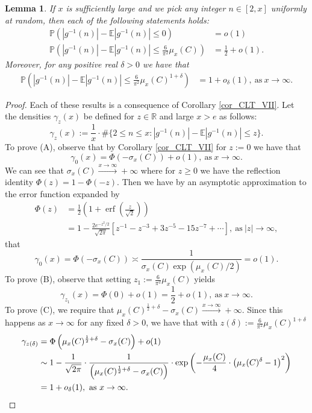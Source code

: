 \documentclass[11pt,reqno,a4letter]{article}
\numberwithin{figure}{section}
\numberwithin{table}{section}
\theoremstyle{plain}
\newtheorem{lemma}[theorem]{Lemma}
\numberwithin{theorem}{section}
\theoremstyle{definition}
\begin{document}
\begin{lemma} 
\label{lemma_ProbsOfAbsgInvnDist_v2} 
If $x$ is sufficiently large and we pick any integer $n \in [2, x]$ uniformly at random, then 
each of the following statements holds: 
\begin{align*} 
\tag{A}
\mathbb{P}\left(|g^{-1}(n)| - \mathbb{E}|g^{-1}(n)| \leq 0\right) & = o(1) \\ 
\tag{B} 
\mathbb{P}\left(|g^{-1}(n)| - \mathbb{E}|g^{-1}(n)| \leq \frac{6}{\pi^2} \mu_x(C)\right) & = 
     \frac{1}{2} + o(1). 
\end{align*} 
Moreover, for any positive real $\delta > 0$ we have that 
\begin{align*} 
\tag{C} 
\mathbb{P}\left(|g^{-1}(n)| - \mathbb{E}|g^{-1}(n)| \leq \frac{6}{\pi^2} \mu_x(C)^{1 + \delta}\right) & = 
     1 + o_{\delta}(1), 
     \mathrm{\ as\ } x \rightarrow \infty. 
\end{align*} 
\end{lemma} 
\begin{proof} 
Each of these results is a consequence of Corollary \ref{cor_CLT_VII}. 
Let the densities $\gamma_z(x)$ be defined for $z \in \mathbb{R}$ and 
large $x > e$ as follows: 
\[
\gamma_z(x) := \frac{1}{x} \cdot \#\{2 \leq n \leq x: |g^{-1}(n)| - \mathbb{E}|g^{-1}(n)| \leq z\}. 
\]
To prove (A), observe that by Corollary \ref{cor_CLT_VII} for $z := 0$ we have that 
\[
\gamma_0(x) = \Phi\left(-\sigma_x(C)\right) + o(1), \mathrm{\ as\ } x \rightarrow \infty. 
\]
We can see that $\sigma_x(C) \xrightarrow{x \rightarrow \infty} +\infty$ where for $z \geq 0$ we have the 
reflection identity $\Phi(z) = 1 - \Phi(-z)$. Then we have by an asymptotic approximation 
to the error function expanded by 
\begin{align*} 
\Phi(z) & = \frac{1}{2}\left(1 + \operatorname{erf}\left(\frac{z}{\sqrt{2}}\right)\right) \\ 
     & = 1 - \frac{2e^{-z^2/2}}{\sqrt{2\pi}}\left[ 
     z^{-1} - z^{-3} + 3z^{-5} - 15z^{-7} + \cdots 
     \right], \mathrm{\ as\ } |z| \rightarrow \infty, 
\end{align*} 
that 
\[
\gamma_0(x) = \Phi\left(-\sigma_x(C)\right) \asymp \frac{1}{\sigma_x(C) \exp(\mu_x(C)/2)} = o(1). 
\]
To prove (B), observe that setting $z_1 := \frac{6}{\pi^2} \mu_x(C)$ yields 
\[
\gamma_{z_1}(x) = \Phi(0) + o(1) = \frac{1}{2} + o(1), \mathrm{\ as\ } x \rightarrow \infty. 
\]
To prove (C), we require that 
$\mu_x(C)^{\frac{1}{2} + \delta} - \sigma_x(C) \xrightarrow{x \rightarrow \infty} +\infty$. 
Since this happens as $x \rightarrow \infty$ for any fixed $\delta > 0$, we have that 
with $z(\delta) := \frac{6}{\pi^2} \mu_x(C)^{1 + \delta}$ 
\begin{align*} 
\gamma_{z(\delta)} & = \Phi\left(\mu_x(C)^{\frac{1}{2} + \delta} - \sigma_x(C)\right) + o(1) \\ 
     & \sim 1 - \frac{1}{\sqrt{2\pi}} \cdot \frac{1}{\left(\mu_x(C)^{\frac{1}{2} + \delta} - \sigma_x(C)\right)} \cdot 
     \exp\left(-\frac{\mu_x(C)}{4} \cdot \left(\mu_x(C)^{\delta} - 1\right)^2\right) \\ 
     & = 1 + o_{\delta}(1), \mathrm{\ as\ } x \rightarrow \infty. 
     \qedhere 
\end{align*} 
\end{proof} 
\end{document}
